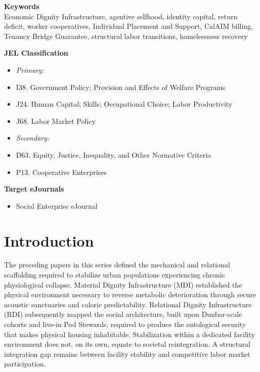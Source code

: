 \documentclass[12pt, letterpaper]{article}
\begin{document}
\noindent\textbf{Keywords}\\[1pt]
Economic Dignity Infrastructure, agentive selfhood, identity capital, return deficit, worker cooperatives, Individual Placement and Support, CalAIM billing, Tenancy Bridge Guarantee, structural labor transitions, homelessness recovery

\vspace{8pt}
\noindent\textbf{JEL Classification}
\begin{itemize}[nosep, before={\vspace{-8pt}}, leftmargin=2em]
    \item[] \textit{Primary:}
    \item I38. Government Policy; Provision and Effects of Welfare Programs
    \item J24. Human Capital; Skills; Occupational Choice; Labor Productivity
    \item J68. Labor Market Policy
    \item[] \textit{Secondary:}
    \item D63. Equity, Justice, Inequality, and Other Normative Criteria
    \item P13. Cooperative Enterprises
\end{itemize}

\vspace{8pt}
\noindent\textbf{Target eJournals}
\begin{itemize}[nosep, before={\vspace{-8pt}}, leftmargin=2em]
    \item Social Enterprise eJournal
\end{itemize}



\newpage
\vspace{12pt}
\begingroup
{}
\setlength{\cftbeforesecskip}{2pt}
\setlength{\cftbeforesubsecskip}{-2pt}
\tableofcontents
\endgroup

\section{Introduction}

The preceding papers in this series defined the mechanical and relational scaffolding required to stabilize urban populations experiencing chronic physiological collapse. Material Dignity Infrastructure (MDI) established the physical environment necessary to reverse metabolic deterioration through secure acoustic sanctuaries and caloric predictability. Relational Dignity Infrastructure (RDI) subsequently mapped the social architecture, built upon Dunbar-scale cohorts and live-in Pod Stewards, required to produce the ontological security that makes physical housing inhabitable. Stabilization within a dedicated facility environment does not, on its own, equate to societal reintegration. A structural integration gap remains between facility stability and competitive labor market participation.
\end{document}
